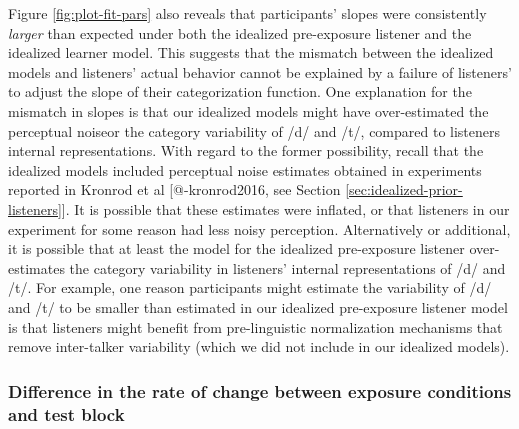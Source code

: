 \documentclass[
  11pt,
  man,mask,floatsintext]{apa6}
\begin{document}
Figure \ref{fig:plot-fit-pars} also reveals that participants' slopes were consistently \emph{larger} than expected under both the idealized pre-exposure listener and the idealized learner model. This suggests that the mismatch between the idealized models and listeners' actual behavior cannot be explained by a failure of listeners' to adjust the slope of their categorization function. One explanation for the mismatch in slopes is that our idealized models might have over-estimated the perceptual noiseor the category variability of /d/ and /t/, compared to listeners internal representations. With regard to the former possibility, recall that the idealized models included perceptual noise estimates obtained in experiments reported in Kronrod et al {[}@-kronrod2016, see Section \ref{sec:idealized-prior-listeners}{]}. It is possible that these estimates were inflated, or that listeners in our experiment for some reason had less noisy perception. Alternatively or additional, it is possible that at least the model for the idealized pre-exposure listener over-estimates the category variability in listeners' internal representations of /d/ and /t/. For example, one reason participants might estimate the variability of /d/ and /t/ to be smaller than estimated in our idealized pre-exposure listener model is that listeners might benefit from pre-linguistic normalization mechanisms that remove inter-talker variability (which we did not include in our idealized models).

\subsubsection{Difference in the rate of change between exposure conditions and test block}\label{difference-in-the-rate-of-change-between-exposure-conditions-and-test-block}
\end{document}
